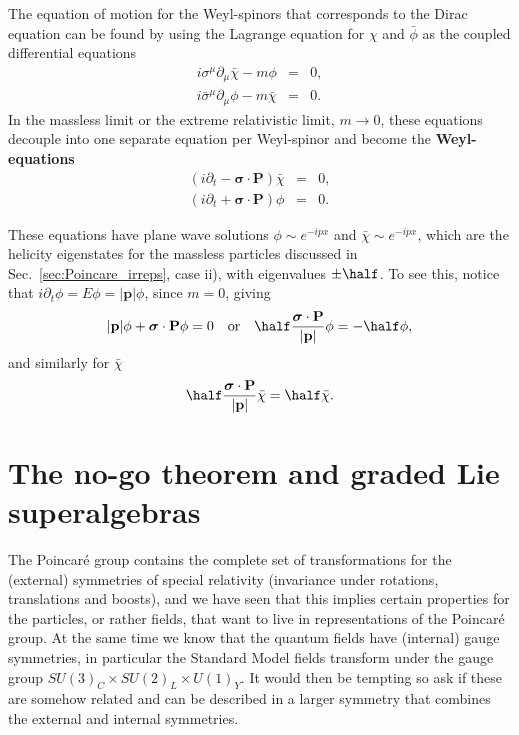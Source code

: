 \documentclass[notes.tex]{subfiles}
\begin{document}
The equation of motion for the Weyl-spinors that corresponds to the Dirac equation can be found by using the Lagrange equation for $\chi$ and $\bar\phi$
 as the coupled differential equations
\begin{eqnarray*}
i\sigma^\mu\partial_\mu\bar\chi -m\phi &=& 0,\\
i\bar\sigma^\mu\partial_\mu\phi -m\bar\chi &=& 0.
\end{eqnarray*}
In the massless limit or the extreme relativistic limit, $m\to 0$, these equations decouple into one separate equation per Weyl-spinor and become the {\bf Weyl-equations}
\begin{eqnarray*}
(i\partial_t - \boldsymbol\sigma\cdot \mathbf P) \bar\chi &=& 0,\\
(i\partial_t + \boldsymbol\sigma\cdot \mathbf P)\phi  &=& 0.
\end{eqnarray*}

These equations have plane wave solutions $\phi \sim e^{-ipx}$ and $\bar\chi\sim e^{-ipx}$, which are the helicity eigenstates for the massless particles discussed in Sec.~\ref{sec:Poincare_irreps}, case ii), with eigenvalues $\pm\half$. To see this, notice that $i\partial_t\phi=E\phi=|\mathbf p|\phi$, since $m=0$, giving
\[  |\mathbf p|\phi + \boldsymbol\sigma\cdot \mathbf P\phi = 0 \quad\text{or}\quad \half\frac{\boldsymbol\sigma\cdot \mathbf P}{|\mathbf p|}\phi =- \half \phi, \]
and similarly for $\bar\chi$
\[ \half\frac{\boldsymbol\sigma\cdot \mathbf P}{|\mathbf p|}\bar\chi = \half \bar\chi. \]



\section{The no-go theorem and graded Lie superalgebras}
\label{sec:superalgebra}
The Poincaré group contains the complete set of transformations for the (external) symmetries of special relativity (invariance under rotations, translations and boosts), and we have seen that this implies certain properties for the particles, or rather fields, that want to live in representations of the Poincaré group. At the same time we know that the quantum fields have (internal) gauge symmetries, in particular the Standard Model fields transform under the gauge group $SU(3)_C\times SU(2)_L\times U(1)_Y$. It would then be tempting so ask if these are somehow related and can be described in a larger symmetry that combines the external and internal symmetries.
\end{document}
